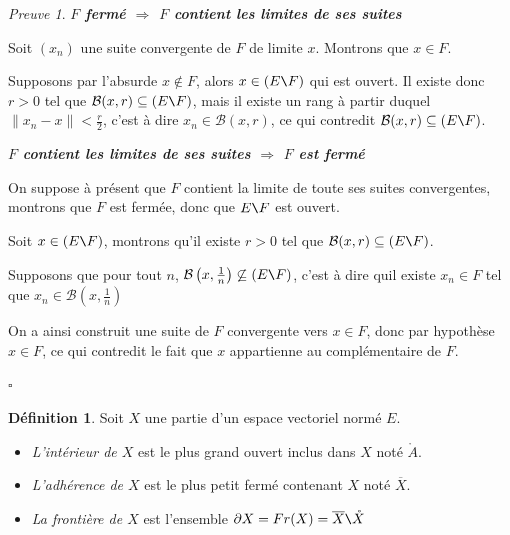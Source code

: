 \documentclass[]{article}
\theoremstyle{remark}
\newtheorem{myproof}{Preuve}
\theoremstyle{definition}
\newtheorem{mydef}{Définition}
\newcommand{\cqfd}{
	\hfill$\square$
}
\newenvironment{proofpart}[1]{
	\leavevmode
	
	\noindent
	{\textit{\textbf{\boldmath #1}}}
	
}{
	\checkmark
}
\begin{document}
\begin{myproof}
	\begin{proofpart}{$F$ fermé $\Longrightarrow$ $F$ contient les limites de ses suites}

		Soit $(x_n)$ une suite convergente de $F$ de limite $x$. Montrons que $x \in F$.
		
		Supposons par l'absurde $x \not \in F$, alors $x \in (E \verb|\| F)$ qui est ouvert. Il existe donc $r > 0$ tel que $\mathcal{B}(x, r) \subseteq (E \verb|\|F)$, mais il existe un rang à partir duquel $\|x_n-x\| < \frac{r}{2}$, c'est à dire $x_n \in \mathcal{B}(x, r)$, ce qui contredit $\mathcal{B}(x, r) \subseteq (E \verb|\| F)$.
	\end{proofpart}
	
	
	\begin{proofpart}{$F$ contient les limites de ses suites $\Longrightarrow$ $F$ est fermé}
	
		On suppose à présent que $F$ contient la limite de toute ses suites convergentes, montrons que $F$ est fermée, donc que $E \verb|\|F$ est ouvert.
		
		Soit $x \in (E \verb|\|F)$, montrons qu'il existe $r > 0$ tel que $\mathcal{B}(x, r) \subseteq (E \verb|\|F)$.
		
		Supposons que pour tout $n$, $\mathcal{B}\left(x, \frac{1}{n}\right) \not \subseteq (E \verb|\| F)$, c'est à dire quil existe $x_n \in F$ tel que $x_n \in \mathcal{B}\left(x, \frac{1}{n}\right)$
		
		On a ainsi construit une suite de $F$ convergente vers $x \in F$, donc par hypothèse $x \in F$, ce qui contredit le fait que $x$ appartienne au complémentaire de $F$.
	\end{proofpart}
	
	\cqfd
\end{myproof}

\begin{mydef}
	Soit $X$ une partie d'un espace vectoriel normé $E$.
	
	\begin{itemize}
	\item \textit{L'intérieur de $X$} est le plus grand ouvert inclus dans $X$ noté $\mathring{A}$.
	
	\item \textit{L'adhérence de $X$} est le plus petit fermé contenant $X$ noté $\overline{X}$.
	
	\item \textit{La frontière de $X$} est l'ensemble $\partial X=Fr(X)=\overline{X} \verb|\| \mathring{X}$
	\end{itemize}
\end{mydef}
\end{document}

